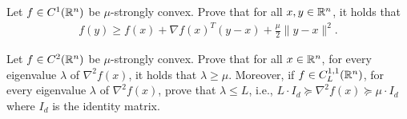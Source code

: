\documentclass{ExerciseSheet}
\newif\ifsolutions
\begin{document}
\fi

\vskip 0.5cm
\begin{problem}[Lemma 5.3]
    Let $f\in C^1(\mathbb{R}^n)$ be $\mu$-strongly convex. Prove that for all $x,y \in \mathbb{R}^n$, it holds that
    \begin{align*}
        f(y) \geq f(x) + \nabla f(x)^T(y-x)+\frac{\mu}{2}\lVert y-x\rVert^2.
    \end{align*}
\end{problem}

\ifsolutions
\vskip 0.3cm

\begin{solution}
    Lemma 5.1 implies that strongly convex function $f$ satisfies $f(x)=g(x)+\frac{\mu}{2}\lVert x\rVert^2$ for convex function $g$. By the convexity of $g$, we obtain
    \begin{align*}
        g(y) \geq g(x) + \langle \nabla g(x),y-x\rangle.
    \end{align*}
    Since $g(x) = f(x) - \frac{\mu}{2}\lVert x\rVert^2$, we plug it into the above inequality
    \begin{align*}
        f(y) - \frac{\mu}{2}\lVert y\rVert^2 \geq f(x) - \frac{\mu}{2}\lVert x\rVert^2 + \langle \nabla f(x)-\mu x, y-x\rangle. 
    \end{align*}
    After rearranging it, we complete the claim.
\end{solution}

\fi

\vskip 0.5cm

\begin{problem}[Lemma 5.4]
    Let $f\in C^2(\mathbb{R}^n)$ be $\mu$-strongly convex. Prove that for all $x\in \mathbb{R}^n$, for every eigenvalue $\lambda$ of $\nabla^2 f(x)$, it holds that $\lambda\geq \mu$. Moreover, if $f\in C^{1,1}_L(\mathbb{R}^n)$, for every eigenvalue $\lambda$ of $\nabla^2 f(x)$, prove that $\lambda\leq L$, i.e., $L \cdot I_d\succcurlyeq \nabla^2 f(x) \succcurlyeq \mu \cdot I_d$ where $I_d$ is the identity matrix.
\end{problem}
\ifsolutions
\vskip 0.3cm
\end{document}
